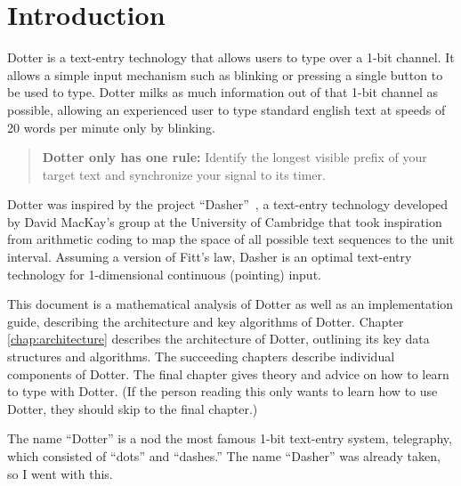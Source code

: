 \chapter*{Introduction}
{}


Dotter is a text-entry technology that allows users to type over a 1-bit channel.
It allows a simple input mechanism such as blinking or pressing a single button
to be used to type.
Dotter milks as much information out of that 1-bit channel as possible,
allowing an experienced user to type standard english text at speeds of 20 words per minute
only by blinking.

\begin{quote}
\textbf{Dotter only has one rule:} Identify the longest visible prefix of your target text and synchronize your signal to its timer.
\end{quote}

Dotter was inspired by the project ``Dasher''~\cite{Ward2000Dasher}, a text-entry technology
developed by David MacKay's group at the University of Cambridge that took inspiration from arithmetic coding to
map the space of all possible text sequences to the unit interval. Assuming a version
of Fitt's law, Dasher is an optimal text-entry technology for 1-dimensional continuous (pointing) input.

This document is a mathematical analysis of Dotter as well as an implementation guide,
describing the architecture and key algorithms of Dotter.
Chapter \ref{chap:architecture} describes the architecture of Dotter,
outlining its key data structures and algorithms.
The succeeding chapters describe individual components of Dotter.
The final chapter gives theory and advice on how to learn to type with Dotter.
(If the person reading this only wants to learn how to use Dotter, they should skip to the final chapter.)

The name ``Dotter'' is a nod the most famous 1-bit text-entry system, telegraphy,
which consisted of ``dots'' and ``dashes.''
The name ``Dasher'' was already taken, so I went with this.
